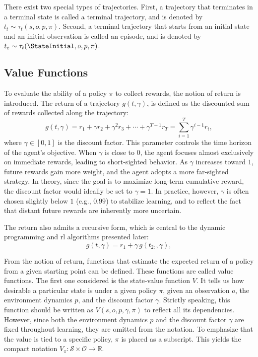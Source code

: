 There exist two special types of trajectories.
First, a trajectory that terminates in a terminal state is called a terminal trajectory, and is denoted by \(t_t \sim \tau_t(s, o, p, \pi)\).
Second, a terminal trajectory that starts from an initial state and an initial observation is called an episode, and is denoted by \(t_e \sim \tau_t(\StateInitial, o, p, \pi)\).

\subsection{Value Functions}
\label{subsec:value_functions}

To evaluate the ability of a policy \(\pi\) to collect rewards, the notion of return is introduced.
The return of a trajectory \(g(t, \gamma)\), is defined as the discounted sum of rewards collected along the trajectory:
\[
g(t, \gamma) = r_1 + \gamma r_2 + \gamma^2 r_3 + \cdots + \gamma^{T-1} r_T = \sum_{i=1}^{T} \gamma^{i-1} r_i,
\]
where \(\gamma \in [0, 1]\) is the discount factor.  
This parameter controls the time horizon of the agent's objective.  
When \(\gamma\) is close to \(0\), the agent focuses almost exclusively on immediate rewards, leading to short-sighted behavior.  
As \(\gamma\) increases toward \(1\), future rewards gain more weight, and the agent adopts a more far-sighted strategy.  
In theory, since the goal is to maximize long-term cumulative reward, the discount factor would ideally be set to \(\gamma = 1\).
In practice, however, \(\gamma\) is often chosen slightly below \(1\) (e.g., \(0.99\)) to stabilize learning, and to reflect the fact that distant future rewards are inherently more uncertain.

The return also admits a recursive form, which is central to the dynamic programming and \gls{rl} algorithms presented later:
\[
g(t, \gamma) = r_1 + \gamma \, g(t_{2:}, \gamma),
\]

From the notion of return, functions that estimate the expected return of a policy from a given starting point can be defined.  
These functions are called value functions.
The first one considered is the state-value function \(V\).  
It tells us how desirable a particular state is under a given policy \(\pi\), given an observation \(o\), the environment dynamics \(p\), and the discount factor \(\gamma\).
Strictly speaking, this function should be written as \(V(s, o, p, \gamma, \pi)\) to reflect all its dependencies.
However, since both the environment dynamics \(p\) and the discount factor \(\gamma\) are fixed throughout learning, they are omitted from the notation.
To emphasize that the value is tied to a specific policy, \(\pi\) is placed as a subscript.
This yields the compact notation \(V_\pi : \mathcal{S} \times \mathcal{O} \to \mathbb{R}\).

